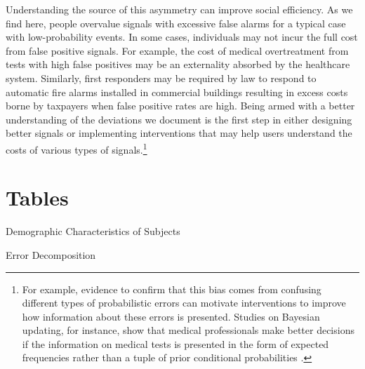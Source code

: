 \documentclass[12pt,a4paper]{article}
\begin{document}
Understanding the source of this asymmetry can improve social efficiency. As we find here, people overvalue signals with excessive false alarms for a typical case with low-probability events. In some cases, individuals may not incur the full cost from false positive signals.  For example, the cost of medical overtreatment from tests with high false positives may be an externality absorbed by the healthcare system.  Similarly, first responders may be required by law to respond to automatic fire alarms installed in commercial buildings resulting in excess costs borne by taxpayers when false positive rates are high. Being armed with a better understanding of the deviations we document is the first step in either designing better signals or implementing interventions that may help users understand the costs of various types of signals.\footnote{For example, evidence to confirm that this bias comes from confusing different types of probabilistic errors can motivate interventions to improve how information about these errors is presented. Studies on Bayesian updating, for instance, show that medical professionals make better decisions if the information on medical tests is presented in the form of expected frequencies rather than a tuple of prior conditional probabilities \citep{hoffrage_natural_2015, mcdowell_meta-analysis_2017}.} 


 

\vspace{20pt}



\clearpage







\appendix
\setcounter{table}{0}
\renewcommand{\thetable}{A\arabic{table}}
\newpage
\section{Tables}


\begin{table}[h!]
\centering
\caption{Demographic Characteristics of Subjects} \label{summ_tab}
	
\end{table}

\begin{table}[h!]
\caption{Error Decomposition} \label{belief_decomposition}

\end{table}
\end{document}
